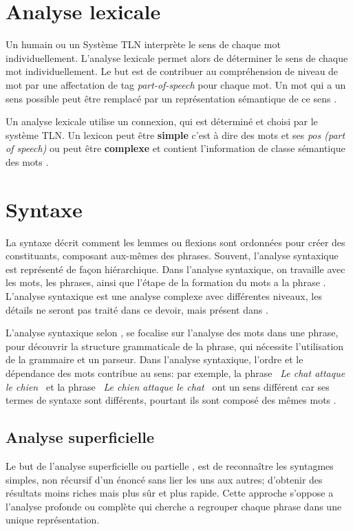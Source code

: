 \section{Analyse lexicale}
Un humain ou un Système TLN interprète le sens de chaque mot individuellement. L'analyse lexicale permet alors de déterminer le sens de chaque mot individuellement. Le but est de contribuer au compréhension de niveau de mot par une affectation de tag \textit{part-of-speech} pour chaque mot. Un mot qui a un sens possible peut être remplacé par un représentation sémantique de ce sens \citep{natural-language-processing}.

Un analyse lexicale utilise un connexion, qui est déterminé et choisi par le système TLN\@. Un lexicon peut être \textbf{simple} c'est à dire des mots et ses \textit{pos (part of speech)} ou peut être \textbf{complexe} et contient l'information de classe sémantique des mots \citep{natural-language-processing}.

\section{Syntaxe}
La syntaxe décrit comment les lemmes ou flexions sont ordonnées pour créer des constituants, composant aux-mêmes des phrases. Souvent, l'analyse syntaxique est représenté de façon hiérarchique. Dans l'analyse syntaxique, on travaille avec les mots, les phrases, ainsi que l'étape de la formation du mots a la phrase \citep{automatic-nlp}. L'analyse syntaxique est une analyse complexe avec différentes niveaux, les détails ne seront pas traité dans ce devoir, mais présent dans  \citep{automatic-nlp}.

L'analyse syntaxique selon \citeauthor{natural-language-processing}, se focalise sur l'analyse des mots dans une phrase, pour découvrir la structure grammaticale de la phrase, qui nécessite l'utilisation de la grammaire et un parseur. Dans l’analyse syntaxique, l'ordre et le dépendance des mots contribue au sens: par exemple, la phrase \textit{\og~Le chat attaque le chien~\fg{}} et la phrase \textit{\og~Le chien attaque le chat~\fg{}} ont un sens différent car ses termes de syntaxe sont différents, pourtant ils sont composé des mêmes mots \citep{natural-language-processing}.

\subsection{Analyse superficielle}
Le but de l'analyse superficielle ou partielle \citep{automatic-nlp}, est de reconnaître les syntagmes simples, non récursif d'un énoncé sans lier les uns aux autres; d'obtenir des résultats moins riches mais plus sûr et plus rapide. Cette approche s'oppose a l'analyse profonde ou complète qui cherche a regrouper chaque phrase dans une unique représentation.

